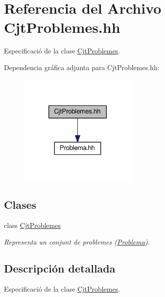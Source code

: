 \hypertarget{_cjt_problemes_8hh}{}\section{Referencia del Archivo Cjt\+Problemes.\+hh}
\label{_cjt_problemes_8hh}


Especificació de la clase \mbox{\hyperlink{class_cjt_problemes}{Cjt\+Problemes}}.  


Dependencia gráfica adjunta para Cjt\+Problemes.\+hh\+:\nopagebreak
\begin{figure}[H]
\begin{center}
\leavevmode
\includegraphics[width=166pt]{_cjt_problemes_8hh__incl}
\end{center}
\end{figure}
\subsection*{Clases}
\begin{DoxyCompactItemize}
\item 
class \mbox{\hyperlink{class_cjt_problemes}{Cjt\+Problemes}}
\begin{DoxyCompactList}\small\item\em Representa un conjunt de problemes (\mbox{\hyperlink{class_problema}{Problema}}). \end{DoxyCompactList}\end{DoxyCompactItemize}


\subsection{Descripción detallada}
Especificació de la clase \mbox{\hyperlink{class_cjt_problemes}{Cjt\+Problemes}}. 

